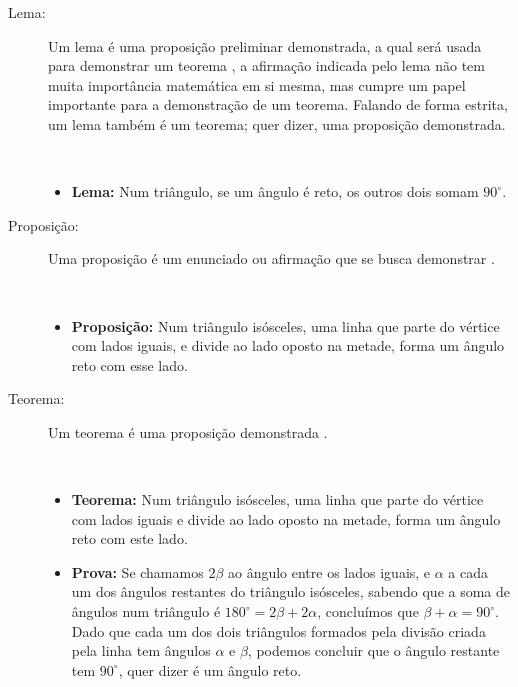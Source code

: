 \begin{description}
\item[Lema:]  Um lema é uma proposição preliminar demonstrada, 
a qual será usada para demonstrar um teorema \cite[pp. 49]{fossa2009introducao}\cite[pp. 41]{solow1987como},
a afirmação indicada pelo lema não tem muita importância matemática em si mesma, 
mas cumpre um papel importante para a demonstração de um teorema.
Falando de forma estrita, um lema também é um teorema; quer dizer, uma proposição demonstrada.
\begin{example}~\\
\begin{itemize}
\item \textbf{Lema:} Num triângulo, se um ângulo é reto, os outros dois somam $90^{\circ}$.
\end{itemize}
\end{example}

\item[Proposição:]  Uma proposição é um enunciado ou afirmação que 
se busca demonstrar \cite[pp. 41]{solow1987como}.
\begin{example}~\\
\begin{itemize}
\item \textbf{Proposição:} Num triângulo isósceles, 
uma linha que parte do vértice com lados iguais, e divide ao lado oposto na metade,
forma um ângulo reto com esse lado.
\end{itemize}
\end{example}

\item[Teorema:]  Um teorema é uma proposição 
demonstrada \cite[pp. 49]{fossa2009introducao} \cite[pp. 41]{solow1987como}.
\begin{example}~\\
\begin{itemize}
\item \textbf{Teorema:} Num triângulo isósceles, 
uma linha que parte do vértice com lados iguais e divide ao lado oposto na metade,
forma um ângulo reto com este lado.
\item \textbf{Prova:}  Se chamamos $2\beta$ ao ângulo entre os lados iguais, 
e $\alpha$ a cada um dos ângulos restantes do triângulo isósceles, sabendo
que a soma de ângulos num triângulo é $180^{\circ}=2\beta+2\alpha$,
concluímos que $\beta+\alpha=90^{\circ}$.
Dado que cada um dos dois triângulos formados pela divisão criada pela linha tem ângulos $\alpha$ e $\beta$,
podemos concluir que o ângulo restante tem $90^{\circ}$, quer dizer é um ângulo reto.
\end{itemize}
\end{example}


\end{description}
